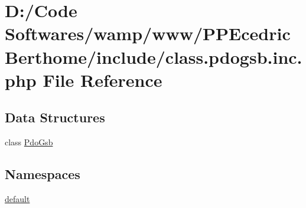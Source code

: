 \hypertarget{class_8pdogsb_8inc_8php}{}\section{D\+:/\+Code Softwares/wamp/www/\+P\+P\+Ecedric\+Berthome/include/class.pdogsb.\+inc.\+php File Reference}
\label{class_8pdogsb_8inc_8php}
\subsection*{Data Structures}
\begin{DoxyCompactItemize}
\item 
class \hyperlink{class_pdo_gsb}{Pdo\+Gsb}
\end{DoxyCompactItemize}
\subsection*{Namespaces}
\begin{DoxyCompactItemize}
\item 
 \hyperlink{namespacedefault}{default}
\end{DoxyCompactItemize}

